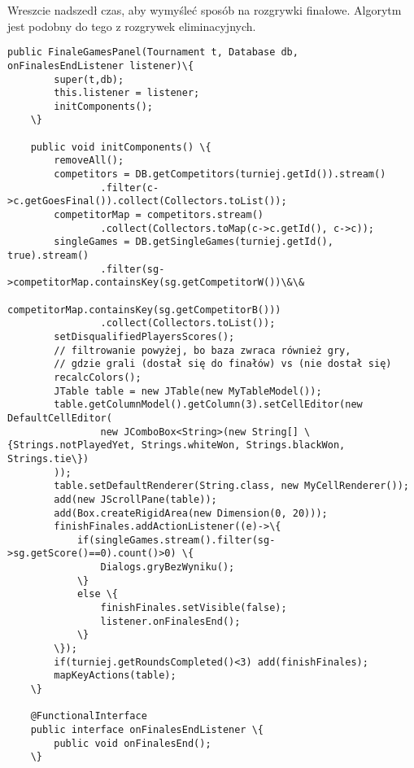 Wreszcie nadszedł czas, aby wymyśleć sposób na rozgrywki finałowe. Algorytm jest podobny do tego z rozgrywek eliminacyjnych.
\begin{verbatim}
public FinaleGamesPanel(Tournament t, Database db, onFinalesEndListener listener)\{
		super(t,db);
		this.listener = listener;
		initComponents();
	\}
	
	public void initComponents() \{
		removeAll();
		competitors = DB.getCompetitors(turniej.getId()).stream()
				.filter(c->c.getGoesFinal()).collect(Collectors.toList());
		competitorMap = competitors.stream()
				.collect(Collectors.toMap(c->c.getId(), c->c));
		singleGames = DB.getSingleGames(turniej.getId(), true).stream()
				.filter(sg->competitorMap.containsKey(sg.getCompetitorW())\&\&
							competitorMap.containsKey(sg.getCompetitorB()))
				.collect(Collectors.toList());
		setDisqualifiedPlayersScores();
		// filtrowanie powyżej, bo baza zwraca również gry, 
		// gdzie grali (dostał się do finałów) vs (nie dostał się)
		recalcColors();
		JTable table = new JTable(new MyTableModel());
		table.getColumnModel().getColumn(3).setCellEditor(new DefaultCellEditor(
        		new JComboBox<String>(new String[] \{Strings.notPlayedYet, Strings.whiteWon, Strings.blackWon, Strings.tie\})
        ));
		table.setDefaultRenderer(String.class, new MyCellRenderer());
	    add(new JScrollPane(table));
		add(Box.createRigidArea(new Dimension(0, 20)));
		finishFinales.addActionListener((e)->\{
			if(singleGames.stream().filter(sg->sg.getScore()==0).count()>0) \{
				Dialogs.gryBezWyniku();
			\}
			else \{
				finishFinales.setVisible(false);
				listener.onFinalesEnd();
			\}
		\});
		if(turniej.getRoundsCompleted()<3) add(finishFinales);
		mapKeyActions(table);
	\}
	
	@FunctionalInterface 
	public interface onFinalesEndListener \{
		public void onFinalesEnd();
	\}
\end{verbatim}

